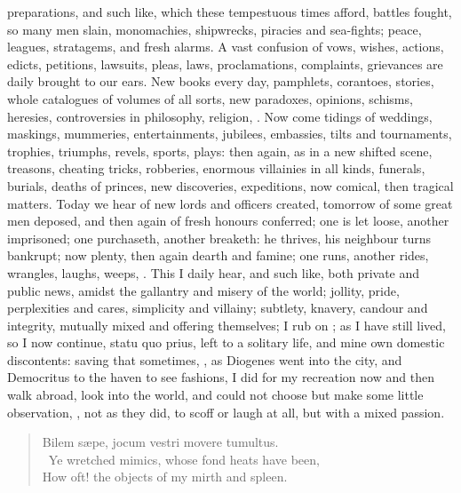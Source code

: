 {preparations, and such like, which these tempestuous times afford,
battles fought, so many men slain, monomachies, shipwrecks, piracies
and sea-fights; peace, leagues, stratagems, and fresh alarms. A vast
confusion of vows, wishes, actions, edicts, petitions, lawsuits, pleas,
laws, proclamations, complaints, grievances are daily brought to our
ears. New books every day, pamphlets, corantoes, stories, whole
catalogues of volumes of all sorts, new paradoxes, opinions, schisms,
heresies, controversies in philosophy, religion, \etc. Now come tidings
of weddings, maskings, mummeries, entertainments, jubilees, embassies,
tilts and tournaments, trophies, triumphs, revels, sports, plays: then
again, as in a new shifted scene, treasons, cheating tricks, robberies,
enormous villainies in all kinds, funerals, burials, deaths of princes,
new discoveries, expeditions, now comical, then tragical matters. Today
we hear of new lords and officers created, tomorrow of some great men
deposed, and then again of fresh honours conferred; one is let loose,
another imprisoned; one purchaseth, another breaketh: he thrives, his
neighbour turns bankrupt; now plenty, then again dearth and famine; one
runs, another rides, wrangles, laughs, weeps, \etc. This I daily hear,
and such like, both private and public news, amidst the gallantry and
misery of the world; jollity, pride, perplexities and cares, simplicity
and villainy; subtlety, knavery, candour and integrity, mutually mixed
and offering themselves; I rub on ; as I have still
lived, so I now continue, statu quo prius, left to a solitary life, and
mine own domestic discontents: saving that sometimes, ,
as Diogenes went into the city, and Democritus to the haven to see
fashions, I did for my recreation now and then walk abroad, look into
the world, and could not choose but make some little observation, ,  not as they did, to
scoff or laugh at all, but with a mixed passion.

\begin{verse}
  Bilem s\ae{}pe, jocum vestri movere tumultus.\\
\
Ye wretched mimics, whose fond heats have been,\\
How oft! the objects of my mirth and spleen.
\end{verse}

}
